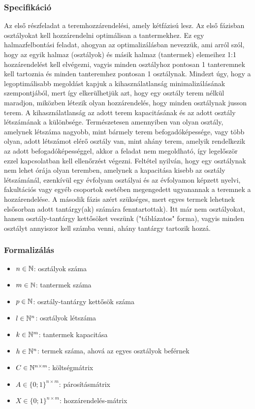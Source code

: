 \documentclass[12pt,a4paper]{report}
\begin{document}
\subsubsection{Specifikáció}

Az első részfeladat a teremhozzárendelési, amely kétfázisú lesz. Az első fázisban osztályokat kell hozzárendelni optimálisan a tantermekhez. Ez egy halmazfelbontási feladat, ahogyan az optimalizálásban nevezzük, ami arról szól, hogy az egyik halmaz (osztályok) és másik halmaz (tantermek) elemeihez 1:1 hozzárendelést kell elvégezni, vagyis minden osztályhoz pontosan
1 tanteremnek kell tartoznia és minden tanteremhez pontosan 1 osztálynak. Mindezt úgy, hogy a legoptimálisabb megoldást kapjuk a kihasználatlanság minimalizálásának szempontjából, mert így elkerülhetjük azt, hogy egy osztály terem nélkül maradjon, miközben létezik olyan hozzárendelés, hogy minden osztálynak jusson terem. A kihasználatlanság az adott terem kapacitásának és az adott osztály létszámának a különbsége. Természetesen amennyiben van olyan osztály, amelynek létszáma nagyobb, mint bármely terem befogadóképessége, vagy több olyan, adott létszámot elérő osztály van, mint ahány terem, amelyik rendelkezik az adott befogadóképességgel, akkor a feladat nem megoldható, így legelőször ezzel kapcsolatban kell ellenőrzést végezni. Feltétel nyilván, hogy egy osztálynak nem lehet órája olyan teremben, amelynek a kapacitása kisebb az osztály létszámánál, ezenkívül egy évfolyam osztályai és az évfolyamon képzett nyelvi, fakultációs vagy egyéb csoportok esetében megengedett ugyanannak a teremnek a hozzárendelése. A második
fázis azért szükséges, mert egyes termek lehetnek elsősorban adott tantárgy(ak) számára fenntartottak). Itt már nem osztályokat, hanem osztály-tantárgy kettősöket veszünk ("táblázatos" forma), vagyis minden osztályt annyiszor kell számba venni, ahány tantárgy tartozik hozzá. 

\subsubsection{Formalizálás}

\begin{itemize}
    \item $n \in \Bbb{N}$: osztályok száma
    \item $m \in \Bbb{N}$: tantermek száma
    \item $p \in \Bbb{N}$: osztály-tantárgy kettősök száma
    \item $l \in \Bbb{N}^n$: osztályok létszáma
    \item $k \in \Bbb{N}^m$: tantermek kapacitása
    \item $h \in \Bbb{N}^n$: termek száma, ahová az egyes osztályok beférnek
    \item $C \in \Bbb{N}^{n \times m}$: költségmátrix
    \item $A \in \{0;1\}^{n \times m}$: párosításmátrix
    \item $X \in \{0;1\}^{n \times m}$: hozzárendelés-mátrix
\end{itemize}
\end{document}
